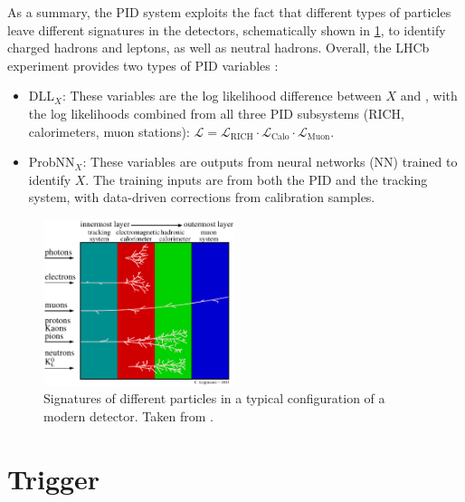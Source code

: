 As a summary, the PID system exploits the fact that different types of
particles leave different signatures in the detectors,
schematically shown in \cref{fig:pid-signature},
to identify charged hadrons and leptons, as well as neutral hadrons.
Overall, the LHCb experiment provides two types of PID variables
\cite{Seuthe:2021fcn}:

\begin{itemize}
    \item DLL$_X$:
        These variables are the log likelihood difference between $X$ and \pion,
        with the log likelihoods combined from all three PID subsystems
        (RICH, calorimeters, muon stations):
        $\mathcal{L} = \mathcal{L}_\text{RICH} \cdot \mathcal{L}_\text{Calo}
        \cdot \mathcal{L}_\text{Muon}$.

    \item ProbNN$_X$:
        These variables are outputs from neural networks (NN) trained to
        identify $X$.
        The training inputs are from both the PID and the tracking system,
        with data-driven corrections from calibration samples.
\end{itemize}

\begin{figure}[!htb]
    \centering
    \includegraphics[width=0.5\textwidth]{./figs-detector/pid/pid_signatures.pdf}
    \caption{
        Signatures of different particles in a typical configuration
        of a modern detector.
        Taken from \cite{Lippmann_2012}.
    }
    \label{fig:pid-signature}
\end{figure}


\section{Trigger}
\label{ref:detector:trigger}


